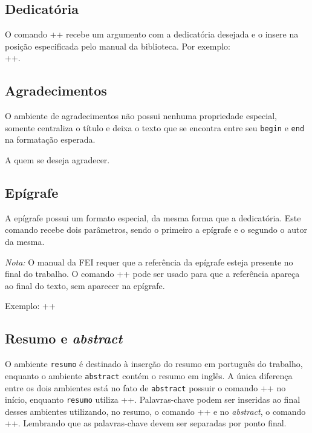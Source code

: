 \documentclass[xindy,rascunho]{fei}
\begin{document}
	\subsection{Dedicatória}
	
    O comando \latexinline+\dedicatoria{}+ recebe um argumento com a dedicatória desejada e o insere na posição especificada pelo manual da biblioteca. Por exemplo: \\ \latexinline++.
    
    \subsection{Agradecimentos}
    
    O ambiente de agradecimentos não possui nenhuma propriedade especial, somente centraliza o título e deixa o texto que se encontra entre seu \texttt{begin} e \texttt{end} na formatação esperada.

\begin{latexcode}    
\begin{agradecimentos}
A quem se deseja agradecer.
\end{agradecimentos}
\end{latexcode}
    
    \subsection{Epígrafe}
    A epígrafe possui um formato especial, da mesma forma que a dedicatória. Este comando recebe dois parâmetros, sendo o primeiro a epígrafe e o segundo o autor da mesma.
    
    \emph{Nota:} O manual da FEI requer que a referência da epígrafe esteja presente no final do trabalho. O comando \latexinline+\nocite{obra}+ pode ser usado para que a referência apareça ao final do texto, sem aparecer na epígrafe.
    
    Exemplo: \latexinline++
    
    \subsection{Resumo e \emph{abstract}}
    
    O ambiente \texttt{resumo} é destinado à inserção do resumo em português do trabalho, enquanto o ambiente \texttt{abstract} contém o resumo em inglês. A única diferença entre os dois ambientes está no fato de \texttt{abstract} possuir o comando \latexinline++ no início, enquanto \texttt{resumo} utiliza \latexinline++. Palavras-chave podem ser inseridas ao final desses ambientes utilizando, no resumo, o comando \latexinline++ e no \emph{abstract}, o comando \latexinline++. Lembrando que as palavras-chave devem ser separadas por ponto final.
\end{document}

